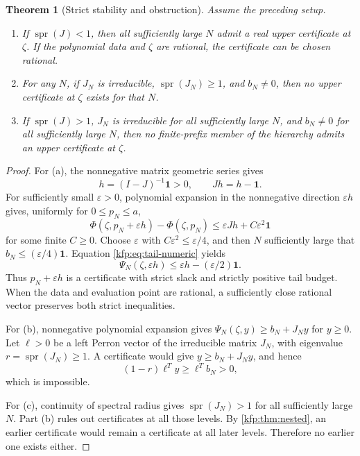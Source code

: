 \documentclass[11pt,a4paper]{article}
\newtheorem{theorem}{Theorem}[section]
\theoremstyle{definition}
\theoremstyle{remark}
\newcommand{\bone}{\boldsymbol 1}
\newcommand{\spr}{\operatorname{spr}}
\begin{document}
\begin{theorem}[Strict stability and obstruction]\label{kfp:thm:stability}
Assume the preceding setup.
\begin{enumerate}[label=(\alph*)]
\item If $\spr(J)<1$, then all sufficiently large $N$ admit a real upper
certificate at $\zeta$. If the polynomial data and $\zeta$ are rational,
the certificate can be chosen rational.
\item For any $N$, if $J_N$ is irreducible,
$\spr(J_N)\geq1$, and $b_N\ne0$, then no upper certificate at $\zeta$
exists for that $N$.
\item If $\spr(J)>1$, $J_N$ is irreducible for all sufficiently large $N$,
and $b_N\ne0$ for all sufficiently large $N$, then no finite-prefix member
of the hierarchy admits an upper certificate at $\zeta$.
\end{enumerate}
\end{theorem}
\begin{proof}
For (a), the nonnegative matrix geometric series gives
\[
 h=(I-J)^{-1}\bone>0,\qquad Jh=h-\bone.
\]
For sufficiently small $\varepsilon>0$, polynomial expansion in the
nonnegative direction $\varepsilon h$ gives, uniformly for $0\leq p_N\leq a$,
\[
 \Phi(\zeta,p_N+\varepsilon h)-\Phi(\zeta,p_N)
 \leq\varepsilon Jh+C\varepsilon^2\bone
\]
for some finite $C\geq0$. Choose $\varepsilon$ with
$C\varepsilon^2\leq\varepsilon/4$, and then $N$ sufficiently large that
$b_N\leq(\varepsilon/4)\bone$. Equation \eqref{kfp:eq:tail-numeric} yields
\[
 \Psi_N(\zeta,\varepsilon h)
 \leq\varepsilon h-(\varepsilon/2)\bone.
\]
Thus $p_N+\varepsilon h$ is a certificate with strict slack and strictly
positive tail budget. When the data and evaluation point are rational,
a sufficiently close rational vector preserves both strict inequalities.

For (b), nonnegative polynomial expansion gives
$\Psi_N(\zeta,y)\geq b_N+J_Ny$ for $y\geq0$.
Let $\ell>0$ be a left Perron vector of the irreducible matrix $J_N$,
with eigenvalue $r=\spr(J_N)\geq1$.
A certificate would give $y\geq b_N+J_Ny$, and hence
\[
 (1-r)\ell^Ty\geq\ell^Tb_N>0,
\]
which is impossible.

For (c), continuity of spectral radius gives $\spr(J_N)>1$ for all
sufficiently large $N$. Part (b) rules out certificates at all those levels.
By \cref{kfp:thm:nested}, an earlier certificate would remain a certificate at
all later levels. Therefore no earlier one exists either.
\end{proof}
\end{document}
